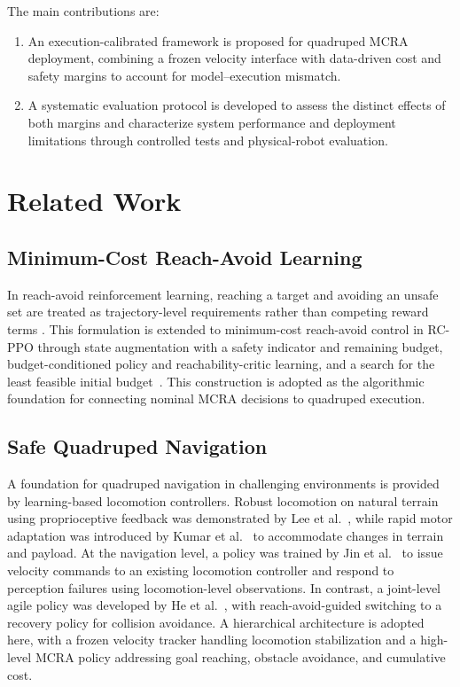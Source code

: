 \documentclass[conference]{IEEEtran}
\begin{document}
The main contributions are:
\begin{enumerate}
\item An execution-calibrated framework is proposed for quadruped MCRA
      deployment, combining a frozen velocity interface with data-driven cost and
      safety margins to account for model--execution mismatch.
\item A systematic evaluation protocol is developed to assess the distinct
      effects of both margins and characterize system performance and deployment
      limitations through controlled tests and physical-robot evaluation.
\end{enumerate}

\section{Related Work}
\subsection{Minimum-Cost Reach-Avoid Learning}
In reach-avoid reinforcement learning, reaching a target and avoiding an unsafe
set are treated as trajectory-level requirements rather than competing reward terms
\cite{bansal2017,ganai2023}. This formulation is extended to minimum-cost
reach-avoid control in RC-PPO through state augmentation with a safety indicator
and remaining budget, budget-conditioned policy and reachability-critic learning,
and a search for the least feasible initial budget~\cite{so2024}. This construction
is adopted as the algorithmic foundation for connecting nominal MCRA decisions
to quadruped execution.

\subsection{Safe Quadruped Navigation}
A foundation for quadruped navigation in challenging environments is provided by
learning-based locomotion controllers. Robust locomotion on natural terrain
using proprioceptive feedback was demonstrated by Lee et al.~\cite{lee2020},
while rapid motor adaptation was introduced by Kumar et al.~\cite{kumar2021}
to accommodate changes in terrain and payload. At the navigation level, a policy
was trained by Jin et al.~\cite{jin2023resilient} to issue velocity commands to an
existing locomotion controller and respond to perception failures using
locomotion-level observations. In contrast, a joint-level agile policy was
developed by He et al.~\cite{he2024abs}, with reach-avoid-guided switching to a
recovery policy for collision avoidance. A
hierarchical architecture is adopted here, with a frozen velocity tracker handling
locomotion stabilization and a high-level MCRA policy addressing goal reaching,
obstacle avoidance, and cumulative cost.
\end{document}
